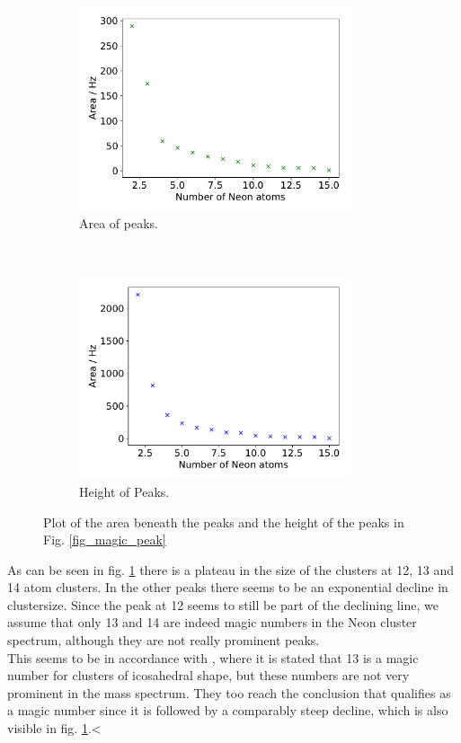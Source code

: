 \documentclass[a4paper,10pt]{article}
\begin{document}
\begin{figure}[H]
  \centering{}
  \begin{subfigure}[t]{0.45 \textwidth}
    \centering
    \includegraphics[height=6cm]{magic_area.pdf}
    \caption{Area of peaks.}
  \end{subfigure}
  ~
  \begin{subfigure}[t]{0.45 \textwidth}
    \centering
    \includegraphics[height=6cm]{magic_height.pdf}
    \caption{Height of Peaks. }
  \end{subfigure}
  \caption{Plot of the area beneath the peaks and the height of the peaks in Fig. \ref{fig_magic_peak}}
  \label{fig_magic_simple}
\end{figure}
As can be seen in fig. \ref{fig_magic_simple} there is a plateau in the size of the clusters at 12, 13 and 14 atom clusters. In the other peaks there seems to be an exponential decline in clustersize. Since the peak at 12 seems to still be part of the declining line, we assume that only 13 and 14 are indeed magic numbers in the Neon cluster spectrum, although they are not really prominent peaks. \\
This seems to be in accordance with \cite{paper_scheier}, where it is stated that 13 is a magic number for clusters of icosahedral shape, but these numbers are not very prominent in the mass spectrum. They too reach the conclusion that  qualifies as a magic number since it is followed by a comparably steep decline, which is also visible in fig. \ref{fig_magic_simple}.<
\end{document}
